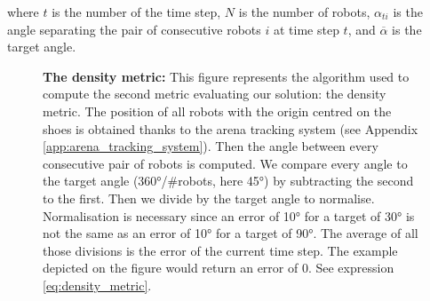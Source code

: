 \documentclass[oneside, a4paper, 12pt]{memoir}
\newcommand{\human}[3][0] %
{
	\draw [very thick, fill=white, rotate around={#1:(#2,#3)}] (#2-1,#3+0.5) ellipse (0.25cm and 0.5cm);
	\draw [very thick, fill=white, rotate around={#1:(#2,#3)}] (#2+1,#3+0.5) ellipse (0.25cm and 0.5cm);
	\draw [very thick, fill=white, rotate around={#1:(#2,#3)}] (#2,#3) ellipse (1.5cm and 0.75cm);
	\draw [thick, fill=white, rotate around={#1:(#2,#3)}] (#2-0.05,#3+1) -- (#2,#3+1.1) -- (#2+0.05,#3+1);
	\draw [very thick, fill=white, rotate around={#1:(#2,#3)}] (#2,#3+0.5) circle [radius=0.5cm];
}
\let\oldCaption\caption
\renewcommand{\caption}[2]{
\oldCaption[#1]{{\small\sffamily\bfseries #1:} #2}
}
\begin{document}
					where $t$ is the number of the time step, $N$ is the number of robots, $\alpha_{ti}$ is the angle separating the pair of consecutive robots $i$ at time step $t$, and $\overline{\alpha}$ is the target angle.
					
					\begin{figure}[!htp]\centering
						
						\caption{The density metric}{This figure represents the algorithm used to compute the second metric evaluating our solution: the density metric. The position of all robots with the origin centred on the shoes is obtained thanks to the arena tracking system (see Appendix \ref{app:arena_tracking_system}). Then the angle between every consecutive pair of robots is computed. We compare every angle to the target angle (360°/\#robots, here 45°) by subtracting the second to the first. Then we divide by the target angle to normalise. Normalisation is necessary since an error of 10° for a target of 30° is not the same as an error of 10° for a target of 90°. The average of all those divisions is the error of the current time step. The example depicted on the figure would return an error of 0. See expression \ref{eq:density_metric}.}
						\label{fig:density_metric}
					\end{figure}
					
\end{document}
